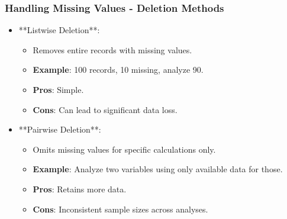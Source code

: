 \documentclass[aspectratio=169]{beamer}
\begin{document}
\begin{frame}[fragile]
    \frametitle{Handling Missing Values - Deletion Methods}
    \begin{itemize}
        \item **Listwise Deletion**: 
            \begin{itemize}
                \item Removes entire records with missing values.
                \item \textbf{Example}: 100 records, 10 missing, analyze 90.
                \item \textbf{Pros}: Simple.
                \item \textbf{Cons}: Can lead to significant data loss.
            \end{itemize}
        \item **Pairwise Deletion**: 
            \begin{itemize}
                \item Omits missing values for specific calculations only.
                \item \textbf{Example}: Analyze two variables using only available data for those.
                \item \textbf{Pros}: Retains more data.
                \item \textbf{Cons}: Inconsistent sample sizes across analyses.
            \end{itemize}
    \end{itemize}
\end{frame}
\end{document}
